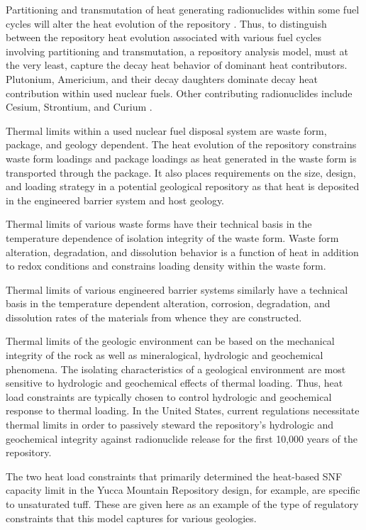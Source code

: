Partitioning and transmutation of heat generating radionuclides within  
some fuel cycles will alter the heat evolution of the repository 
\cite{swift_applying_2010}. Thus, to distinguish  between the repository heat 
evolution associated with various fuel cycles involving partitioning and 
transmutation, a repository analysis model, must at the very least, 
capture the decay heat behavior of dominant heat contributors.  Plutonium, 
Americium, and their decay daughters dominate decay heat contribution within 
used nuclear fuels. Other contributing radionuclides include Cesium, Strontium, 
and Curium \cite{piet_which_2007}. 

Thermal limits within a used nuclear fuel disposal system are waste form, 
package, and geology dependent. The heat evolution of the repository 
constrains waste form loadings and package loadings as heat 
generated in the waste form is transported through the package. It 
also places requirements on the size, design, and loading strategy in a 
potential geological repository as that heat is deposited in the engineered 
barrier system and host geology.

Thermal limits of various waste forms have their technical basis in the 
temperature dependence of isolation integrity of the waste form. Waste form 
alteration, degradation, and dissolution behavior is a function of heat in 
addition to redox conditions and constrains loading
density within the waste form. 
 
Thermal limits of various engineered barrier systems similarly have a technical 
basis in the temperature dependent alteration, corrosion, degradation, and 
dissolution rates of the materials from whence they are constructed.  

Thermal limits of the geologic environment can be based on the mechanical 
integrity of the rock as well as mineralogical, hydrologic and geochemical 
phenomena. The isolating characteristics of a geological environment are most 
sensitive to hydrologic 
and geochemical effects of thermal loading. Thus, heat load constraints are 
typically chosen to control hydrologic and geochemical response to thermal 
loading. In the United States, current regulations necessitate thermal limits in 
order to passively steward the repository's hydrologic and geochemical integrity 
against radionuclide  release for the first 10,000 years of the repository.

The two heat load constraints that primarily determined the heat-based \gls{SNF} 
capacity limit in the Yucca Mountain Repository design, for example, are 
specific to unsaturated tuff. These are given here as an example of the type of 
regulatory constraints that this model captures for various geologies. 


